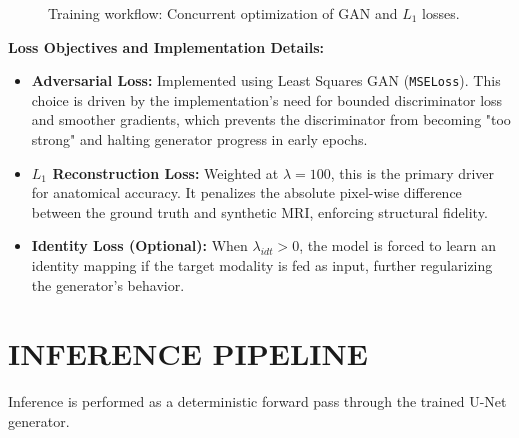 \documentclass[10pt,a4paper]{article}
\begin{document}
\begin{figure}[H]
\centering
{}
\caption{Training workflow: Concurrent optimization of GAN and $L_1$ losses.}
\end{figure}

\textbf{Loss Objectives and Implementation Details:}
\begin{itemize}
    \item \textbf{Adversarial Loss:} Implemented using Least Squares GAN (\texttt{MSELoss}). This choice is driven by the implementation's need for bounded discriminator loss and smoother gradients, which prevents the discriminator from becoming "too strong" and halting generator progress in early epochs.
    \item \textbf{$L_1$ Reconstruction Loss:} Weighted at $\lambda = 100$, this is the primary driver for anatomical accuracy. It penalizes the absolute pixel-wise difference between the ground truth and synthetic MRI, enforcing structural fidelity.
    \item \textbf{Identity Loss (Optional):} When $\lambda_{idt} > 0$, the model is forced to learn an identity mapping if the target modality is fed as input, further regularizing the generator's behavior.
\end{itemize}

\section{INFERENCE PIPELINE}
Inference is performed as a deterministic forward pass through the trained U-Net generator.
\end{document}
